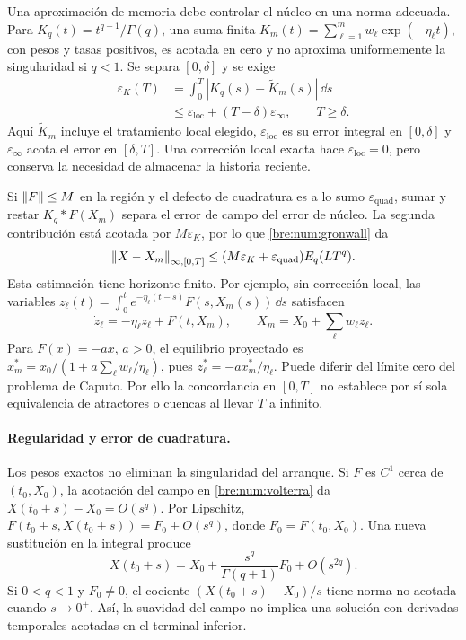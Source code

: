 Una aproximación de memoria debe controlar el núcleo en una norma adecuada.
Para $K_q(t)=t^{q-1}/\Gamma(q)$, una suma finita
$K_m(t)=\sum_{\ell=1}^m w_\ell\exp(-\eta_\ell t)$, con pesos y tasas
positivos, es acotada en cero y no aproxima uniformemente la singularidad si
$q<1$. Se separa $[0,\delta]$ y se exige
\begin{equation}
 \begin{split}
 \varepsilon_K(T)&=\int_0^T|K_q(s)-\widetilde K_m(s)|\,\dd s\\
 &\leq\varepsilon_{\mathrm{loc}}+(T-\delta)\varepsilon_\infty,
 \qquad T\geq\delta.
 \end{split}
 \label{bre:num:error-nucleo}
\end{equation}
Aquí $\widetilde K_m$ incluye el tratamiento local elegido,
$\varepsilon_{\mathrm{loc}}$ es su error integral en $[0,\delta]$ y
$\varepsilon_\infty$ acota el error en $[\delta,T]$. Una corrección local
exacta hace $\varepsilon_{\mathrm{loc}}=0$, pero conserva la necesidad de
almacenar la historia reciente.

Si $\left\lVert F\right\rVert\leq M$ en la región y el defecto de cuadratura es a lo sumo
$\varepsilon_{\mathrm{quad}}$, sumar y restar $K_q*F(X_m)$ separa el error
de campo del error de núcleo. La segunda contribución está acotada por
$M\varepsilon_K$, por lo que \eqref{bre:num:gronwall} da
\begin{equation}
 \left\lVert X-X_m\right\rVert_{\infty,[0,T]}
 \leq(M\varepsilon_K+\varepsilon_{\mathrm{quad}})E_q(LT^q).
 \label{bre:num:error-soe}
\end{equation}
Esta estimación tiene horizonte finito. Por ejemplo, sin corrección local,
las variables $z_\ell(t)=\int_0^t e^{-\eta_\ell(t-s)}F(s,X_m(s))\,\dd s$
satisfacen
\[
 \dot z_\ell=-\eta_\ell z_\ell+F(t,X_m),\qquad
 X_m=X_0+\sum_\ell w_\ell z_\ell.
\]
Para $F(x)=-ax$, $a>0$, el equilibrio proyectado es
$x_m^*=x_0/(1+a\sum_\ell w_\ell/\eta_\ell)$, pues
$z_\ell^*=-ax_m^*/\eta_\ell$. Puede diferir del límite cero del problema
de Caputo. Por ello la concordancia en $[0,T]$ no establece por sí sola
equivalencia de atractores o cuencas al llevar $T$ a infinito.

\paragraph{Regularidad y error de cuadratura.}
Los pesos exactos no eliminan la singularidad del arranque. Si \(F\) es
\(C^1\) cerca de \((t_0,X_0)\), la acotación del campo en
\eqref{bre:num:volterra} da \(X(t_0+s)-X_0=O(s^q)\). Por Lipschitz,
\(F(t_0+s,X(t_0+s))=F_0+O(s^q)\), donde \(F_0=F(t_0,X_0)\). Una nueva
sustitución en la integral produce
\begin{equation}
 X(t_0+s)=X_0+\frac{s^q}{\Gamma(q+1)}F_0+O(s^{2q}).
 \label{bre:num:arranque}
\end{equation}
Si \(0<q<1\) y \(F_0\ne0\), el cociente
\((X(t_0+s)-X_0)/s\) tiene norma no acotada cuando \(s\to0^+\). Así, la
suavidad del campo no implica una solución con derivadas temporales acotadas
en el terminal inferior.

